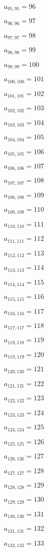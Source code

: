\documentclass[a4paper,12pt]{article}
\begin{document}
$a _{ 95, 95 } = 96$

$a _{ 96, 96 } = 97$

$a _{ 97, 97 } = 98$

$a _{ 98, 98 } = 99$

$a _{ 99, 99 } = 100$

$a _{ 100, 100 } = 101$

$a _{ 101, 101 } = 102$

$a _{ 102, 102 } = 103$

$a _{ 103, 103 } = 104$

$a _{ 104, 104 } = 105$

$a _{ 105, 105 } = 106$

$a _{ 106, 106 } = 107$

$a _{ 107, 107 } = 108$

$a _{ 108, 108 } = 109$

$a _{ 109, 109 } = 110$

$a _{ 110, 110 } = 111$

$a _{ 111, 111 } = 112$

$a _{ 112, 112 } = 113$

$a _{ 113, 113 } = 114$

$a _{ 114, 114 } = 115$

$a _{ 115, 115 } = 116$

$a _{ 116, 116 } = 117$

$a _{ 117, 117 } = 118$

$a _{ 118, 118 } = 119$

$a _{ 119, 119 } = 120$

$a _{ 120, 120 } = 121$

$a _{ 121, 121 } = 122$

$a _{ 122, 122 } = 123$

$a _{ 123, 123 } = 124$

$a _{ 124, 124 } = 125$

$a _{ 125, 125 } = 126$

$a _{ 126, 126 } = 127$

$a _{ 127, 127 } = 128$

$a _{ 128, 128 } = 129$

$a _{ 129, 129 } = 130$

$a _{ 130, 130 } = 131$

$a _{ 131, 131 } = 132$

$a _{ 132, 132 } = 133$
\end{document}
